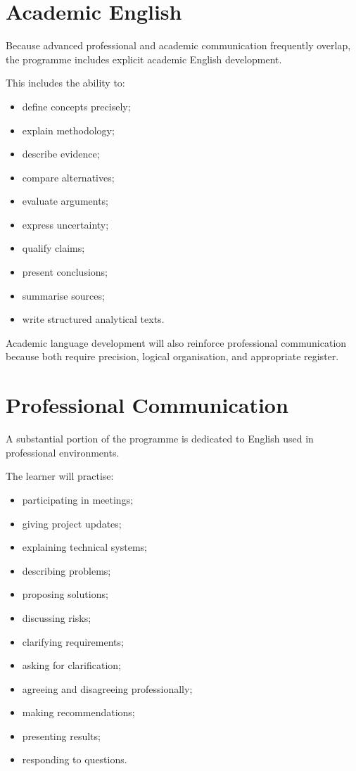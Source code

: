 \section*{Academic English}

Because advanced professional and academic communication frequently overlap, the programme includes explicit academic English development.

This includes the ability to:

\begin{itemize}
    \item define concepts precisely;
    \item explain methodology;
    \item describe evidence;
    \item compare alternatives;
    \item evaluate arguments;
    \item express uncertainty;
    \item qualify claims;
    \item present conclusions;
    \item summarise sources;
    \item write structured analytical texts.
\end{itemize}

Academic language development will also reinforce professional communication because both require precision, logical organisation, and appropriate register.

\section*{Professional Communication}

A substantial portion of the programme is dedicated to English used in professional environments.

The learner will practise:

\begin{itemize}
    \item participating in meetings;
    \item giving project updates;
    \item explaining technical systems;
    \item describing problems;
    \item proposing solutions;
    \item discussing risks;
    \item clarifying requirements;
    \item asking for clarification;
    \item agreeing and disagreeing professionally;
    \item making recommendations;
    \item presenting results;
    \item responding to questions.
\end{itemize}

